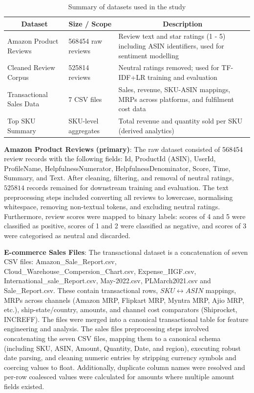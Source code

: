\documentclass[authoryear,review,3p,times,12pt]{elsarticle}
\begin{document}
\begin{table}[htpb]
\centering
\caption{Summary of datasets used in the study}
\label{tab:summary_datasets}
\begin{tabular}{p{3cm} p{5cm} p{6cm}}
\hline
\multicolumn{1}{c}{\textbf{Dataset}} & \multicolumn{1}{c}{\textbf{Size   / Scope}} & \multicolumn{1}{c}{\textbf{Description}}       \\ \hline                                
Amazon Product   Reviews & 568454 raw   reviews & Review text and   star ratings (1 - 5) including ASIN identifiers, used for sentiment modelling \\
Cleaned Review   Corpus              & 525814 reviews                              & Neutral ratings   removed; used for TF-IDF+LR training and evaluation                 \\
Transactional   Sales Data           & 7 CSV files                                 & Sales, revenue,   SKU-ASIN mappings, MRPs across platforms, and fulfilment cost data \\
Top SKU Summary                      & SKU-level   aggregates                      & Total revenue   and quantity sold per SKU (derived analytics)   
\\ \hline
\end{tabular}
\end{table}

\textbf{Amazon Product Reviews (primary)}: The raw dataset consisted of 568454 review records with the following fields: Id, ProductId (ASIN), UserId, ProfileName, HelpfulnessNumerator, HelpfulnessDenominator, Score, Time, Summary, and Text. After cleaning, filtering, and removal of neutral ratings, $525814$ records remained for downstream training and evaluation. The text preprocessing steps included converting all reviews to lowercase, normalising whitespace, removing non-textual tokens, and excluding neutral ratings. Furthermore, review scores were mapped to binary labels: scores of 4 and 5 were classified as positive, scores of 1 and 2 were classified as negative, and scores of 3 were categorised as neutral and discarded.

\textbf{E-commerce Sales Files}: The transactional dataset is a concatenation of seven CSV files: Amazon\_Sale\_Report.csv, Cloud\_Warehouse\_Compersion\_Chart.csv, Expense\_IIGF.csv, International\_sale\_Report.csv, May-2022.csv, PLMarch2021.csv and Sale\_Report.csv. These contain transactional rows, $SKU \leftrightarrow ASIN$ mappings, MRPs across channels (Amazon MRP, Flipkart MRP, Myntra MRP, Ajio MRP, etc.), ship-state/country, amounts, and channel cost comparators (Shiprocket, INCREFF). The files were merged into a canonical transactional table for feature engineering and analysis. The sales files preprocessing steps involved concatenating the seven CSV files, mapping them to a canonical schema (including SKU, ASIN, Amount, Quantity, Date, and region), executing robust date parsing, and cleaning numeric entries by stripping currency symbols and coercing values to float. Additionally, duplicate column names were resolved and per-row coalesced values were calculated for amounts where multiple amount fields existed.
\end{document}
